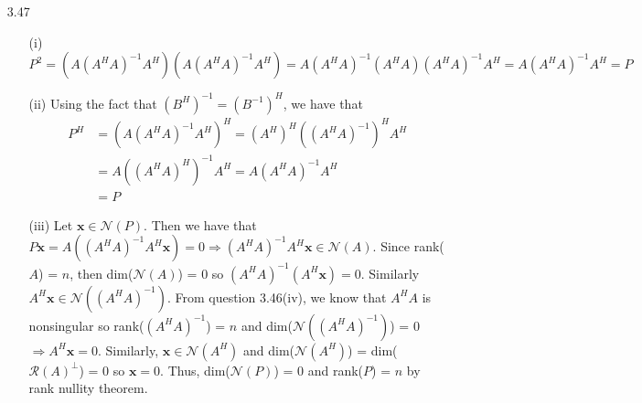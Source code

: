 \documentclass[letterpaper,12pt]{article}
\theoremstyle{definition}
\begin{document}
\begin{enumerate}
        \item[3.47]
          \begin{enumerate}
            \item[(i)]
              \begin{equation*}
                P^2 = (A(A^HA)^{-1}A^H)(A(A^HA)^{-1}A^H) = A(A^HA)^{-1}(A^HA)(A^HA)^{-1}A^H = A(A^HA)^{-1}A^H = P
              \end{equation*}
            \item[(ii)]
            Using the fact that $(B^H)^{-1} = (B^{-1})^H$, we have that
            \begin{align*}
              P^H &= (A(A^HA)^{-1}A^H)^H = (A^H)^H((A^HA)^{-1})^HA^H \\
              &= A((A^HA)^H)^{-1}A^H = A(A^HA)^{-1}A^H\\
              &=P
            \end{align*}
            \item[(iii)]
            Let $\mathbf{x} \in \mathscr{N}(P)$. Then we have that $P\mathbf{x} = A((A^HA)^{-1}A^H\mathbf{x}) = 0 \Longrightarrow (A^HA)^{-1}A^H\mathbf{x} \in \mathscr{N}(A)$. Since rank($A$) = $n$, then dim($\mathscr{N}(A)$) = 0 so $(A^HA)^{-1}(A^H\mathbf{x}) = 0$. Similarly $A^H\mathbf{x} \in \mathscr{N}((A^HA)^{-1})$. From question 3.46(iv), we know that $A^HA$ is nonsingular so rank($(A^HA)^{-1}$) = $n$ and dim($\mathscr{N}((A^HA)^{-1})$) = 0 $\Longrightarrow A^H\mathbf{x} = 0$. Similarly, $\mathbf{x} \in \mathscr{N}(A^H)$ and dim($\mathscr{N}(A^H)$) = dim($\mathscr{R}(A)^\perp$) = 0 so $\mathbf{x} = 0$. Thus, dim($\mathscr{N}(P)$) = 0 and rank($P$) = $n$ by rank nullity theorem.
          \end{enumerate}


\end{enumerate}
\end{document}
